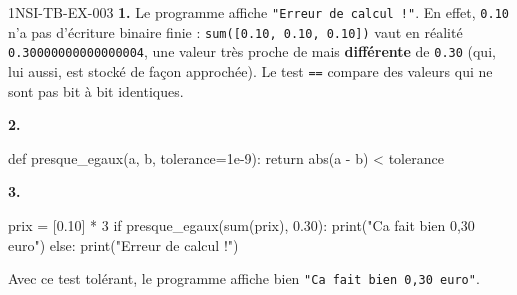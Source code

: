 \begin{corrige}{1NSI-TB-EX-003}
\textbf{1.} Le programme affiche \lstinline{"Erreur de calcul !"}. En effet,
\lstinline{0.10} n'a pas d'écriture binaire finie : \lstinline{sum([0.10, 0.10, 0.10])}
vaut en réalité \lstinline{0.30000000000000004}, une valeur très proche de mais
\textbf{différente} de \lstinline{0.30} (qui, lui aussi, est stocké de façon approchée). Le
test \lstinline{==} compare des valeurs qui ne sont pas bit à bit identiques.

\textbf{2.}
\begin{python}
def presque_egaux(a, b, tolerance=1e-9):
    return abs(a - b) < tolerance
\end{python}

\textbf{3.}
\begin{python}
prix = [0.10] * 3
if presque_egaux(sum(prix), 0.30):
    print("Ca fait bien 0,30 euro")
else:
    print("Erreur de calcul !")
\end{python}
Avec ce test tolérant, le programme affiche bien \lstinline{"Ca fait bien 0,30 euro"}.
\end{corrige}
